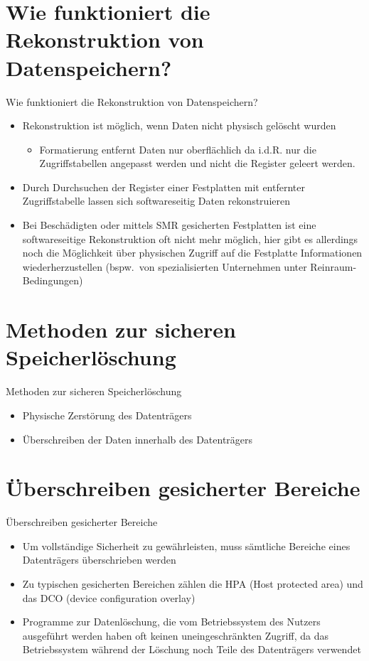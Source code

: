 \documentclass[aspectratio=169]{beamer}
\begin{document}
\section{Wie funktioniert die Rekonstruktion von Datenspeichern?}
\begin{frame}{Wie funktioniert die Rekonstruktion von Datenspeichern?}
	\begin{itemize}
		\item Rekonstruktion ist möglich, wenn Daten nicht physisch gelöscht
			wurden
			\begin{itemize}
				\item Formatierung entfernt Daten nur oberflächlich da i.d.R.
					nur die Zugriffstabellen angepasst werden und nicht die
					Register geleert werden.
			\end{itemize}
		\item Durch Durchsuchen der Register einer Festplatten mit entfernter
			Zugriffstabelle lassen sich softwareseitig Daten rekonstruieren
		\item Bei Beschädigten oder mittels SMR gesicherten Festplatten ist
			eine softwareseitige Rekonstruktion oft nicht mehr möglich, hier
			gibt es allerdings noch die Möglichkeit über physischen Zugriff auf
			die Festplatte Informationen wiederherzustellen (bspw.\ von
			spezialisierten Unternehmen unter Reinraum-Bedingungen)
	\end{itemize}
\end{frame}

\section{Methoden zur sicheren Speicherlöschung}
\begin{frame}{Methoden zur sicheren Speicherlöschung}
	\begin{itemize}
		\item Physische Zerstörung des Datenträgers
		\item Überschreiben der Daten innerhalb des Datenträgers
	\end{itemize}
\end{frame}

\section{Überschreiben gesicherter Bereiche}
\begin{frame}{Überschreiben gesicherter Bereiche}
	\begin{itemize}
		\item Um vollständige Sicherheit zu gewährleisten, muss sämtliche
			Bereiche eines Datenträgers überschrieben werden
		\item Zu typischen gesicherten Bereichen zählen die HPA (Host protected
			area) und das DCO (device configuration overlay)
		\item Programme zur Datenlöschung, die vom Betriebssystem des Nutzers
			ausgeführt werden haben oft keinen uneingeschränkten Zugriff, da das
			Betriebssystem während der Löschung noch Teile des Datenträgers
			verwendet
	\end{itemize}
\end{frame}
\end{document}
